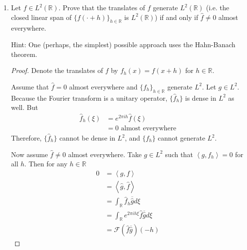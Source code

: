 \documentclass[a4paper]{article}
\newcommand{\R}{\mathbb{R}}
\newcommand{\la}{\left \langle}
\newcommand{\ra}{\right \rangle}
\begin{document}
\begin{enumerate}
\begin{proof}
    Letting $\mu$ denote Lebesgue measure, we have
    \begin{align*}
      \|f\|_\infty^2 &= \| f^2 \|_\infty \\
      &= \inf \left\{ a\geq 0 : \mu \left( \{ x : f^2(x) > a \} \right) = 0 \right\} \\
      &= \inf \left\{ a \geq 0 : \mu \left( \{x : \int_{-\infty}^{x} 2 f(t) f'(t) dt > a \} \right) = 0 \right\} \\
      &\leq 2 \|f\|_p \|f'\|_q
    \end{align*}
    by H\"older's inequality.

  \end{proof}


\item Let $f \in L^ 2 (\mathbb R)$. Prove that the translates of $f$ generate $L^2(\mathbb R)$ (i.e. the closed linear span of $ \{ f(\cdot + h)  \}_{h\in \mathbb R}$ is $L^ 2 (\mathbb R)$)  if and only if $\widehat{f} \neq 0$ almost everywhere.

Hint: One (perhaps, the simplest) possible approach uses the Hahn-Banach theorem.

\begin{proof}

  Denote the translates of $f$ by $f_h(x) = f(x+h)$ for $h \in \R$.

  Assume that $\widehat{f} = 0$ almost everywhere and $\{f_h\}_{h \in \R}$ generate $L^2$. Let $g \in L^2$. Because the Fourier transform is a unitary
  operator, $\{ \widehat{f}_h \}$ is dense in $L^2$ as well. But
  \begin{align*}
    \widehat{f}_h(\xi) &= e^{2\pi i h} \widehat{f} (\xi) \\
    &= 0 \text{ almost everywhere}
  \end{align*}
  Therefore, $\{ \widehat{f}_h \}$ cannot be dense in $L^2$, and $\{ f_h \}$ cannot generate $L^2$.

  Now assume $\widehat{f} \neq 0$ almost everywhere. Take $g \in L^2$ such that $ \la g, f_h \ra = 0$ for all $h$. Then for any $h \in \R$
  \begin{align*}
    0 &= \la g, f \ra \\
    &= \la \widehat{g}, \widehat{f} \ra \\
    &= \int_{\R}^{} \widehat{f}_h \overline{ \widehat{g} } d \xi \\
    &= \int_{\R}^{} e^{2\pi i h \xi} \widehat{f} \overline{ \widehat{g} } d \xi \\
    &= \mathcal{F} (\widehat{f} \overline{ \widehat{g} }) (-h)
  \end{align*}


\end{proof}
\end{enumerate}
\end{document}
